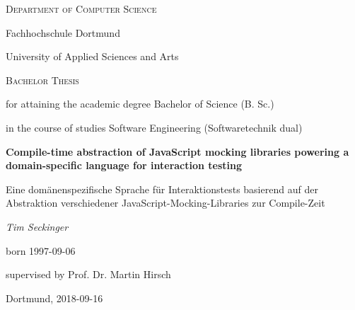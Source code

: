 {\centering
  {\small\scshape Department of Computer Science \par}
  {\large Fachhochschule Dortmund \par}
  {\large University of Applied Sciences and Arts \par}

  \vspace{10mm}

  {\large\scshape Bachelor Thesis\par}
  \vspace{5mm}
  {\small
  for attaining the academic degree Bachelor of Science (B. Sc.)\par
  in the course of studies Software Engineering (Softwaretechnik dual)\par
  }

  \vspace{20mm}

  {\huge\bfseries
    Compile-time abstraction of JavaScript mocking libraries
    powering a domain-specific language for interaction testing
  }

  {\small
    Eine domänenspezifische Sprache für Interaktionstests
    basierend auf der Abstraktion verschiedener JavaScript-Mocking-Libraries zur Compile-Zeit
  \par}

  \vspace{20mm}

  {\large\itshape
  Tim Seckinger\par
  \small born 1997-09-06\par
  }
  \vspace{5mm}
  {\small supervised by Prof. Dr. Martin Hirsch\par}

  \vfill

  {\large Dortmund, 2018-09-16}
}
